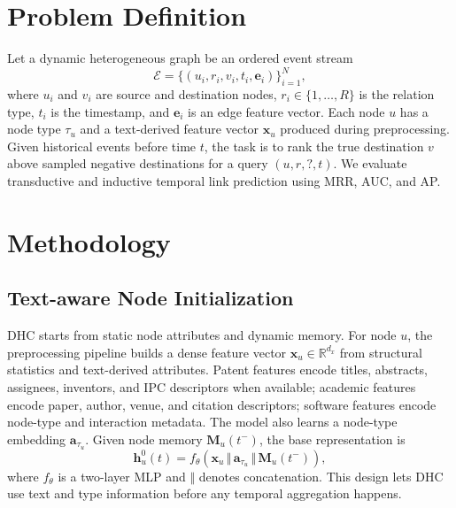 \documentclass[runningheads]{llncs}
\begin{document}
\section{Problem Definition}
Let a dynamic heterogeneous graph be an ordered event stream
\begin{equation}
\mathcal{E}=\{(u_i,r_i,v_i,t_i,\mathbf{e}_i)\}_{i=1}^{N},
\end{equation}
where $u_i$ and $v_i$ are source and destination nodes, $r_i\in\{1,\ldots,R\}$ is the relation type, $t_i$ is the timestamp, and $\mathbf{e}_i$ is an edge feature vector. Each node $u$ has a node type $\tau_u$ and a text-derived feature vector $\mathbf{x}_u$ produced during preprocessing. Given historical events before time $t$, the task is to rank the true destination $v$ above sampled negative destinations for a query $(u,r,?,t)$. We evaluate transductive and inductive temporal link prediction using MRR, AUC, and AP.

\section{Methodology}
\subsection{Text-aware Node Initialization}
DHC starts from static node attributes and dynamic memory. For node $u$, the preprocessing pipeline builds a dense feature vector $\mathbf{x}_u\in\mathbb{R}^{d_x}$ from structural statistics and text-derived attributes. Patent features encode titles, abstracts, assignees, inventors, and IPC descriptors when available; academic features encode paper, author, venue, and citation descriptors; software features encode node-type and interaction metadata. The model also learns a node-type embedding $\mathbf{a}_{\tau_u}$. Given node memory $\mathbf{M}_u(t^-)$, the base representation is
\begin{equation}
\mathbf{h}^{0}_u(t)=f_{\theta}\left(\mathbf{x}_u \,\Vert\, \mathbf{a}_{\tau_u} \,\Vert\, \mathbf{M}_u(t^-)\right),
\end{equation}
where $f_{\theta}$ is a two-layer MLP and $\Vert$ denotes concatenation. This design lets DHC use text and type information before any temporal aggregation happens.
\end{document}
